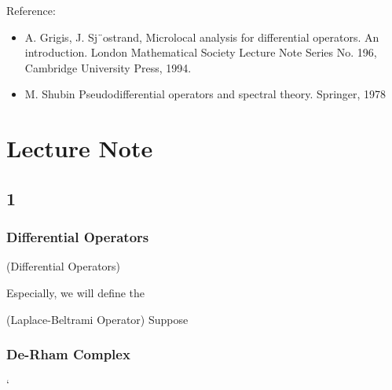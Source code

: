 \documentclass[Total.tex]{subfiles}
\begin{document}
	Reference:
	\begin{itemize}
		\item A. Grigis, J. Sj¨ostrand, Microlocal analysis for differential operators. An
		introduction. London Mathematical Society Lecture Note Series No. 196,
		Cambridge University Press, 1994.
		\item M. Shubin Pseudodifferential operators and spectral theory. Springer, 1978
	\end{itemize}
	\chapter{Lecture Note}
		\section{1}
			\subsection{Differential Operators}
			\begin{Def}
				(Differential Operators)
			\end{Def}
			
			Especially, we will define the 
			\begin{Def}
				(Laplace-Beltrami Operator) Suppose 
			\end{Def}
			\subsection{De-Rham Complex} 	`
\end{document}
